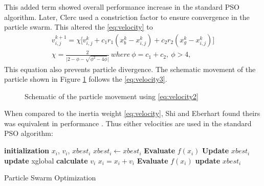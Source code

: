 This added term showed overall performance increase in the standard PSO algorithm. Later, Clerc \cite{Clerc1999} used a constriction factor to ensure convergence in the particle swarm. This altered the \eqref{eq:velocity} to 
\begin{align}
    \label{eq:velocity3}
    v^{k+1}_{i,j} = \chi \big[ v^{k}_{i,j} + c_1r_1(x^{k}_b - x^{k}_{i,j}) + c_2r_2(x^{k}_g - x^{k}_{i,j}) \big] \\
    \chi = \frac{2}{\big| 2- \phi - \sqrt{\phi^2 - 4\phi}\big|}\ where\ \phi = c_1 + c_2,\ \phi>4, \nonumber
\end{align}
This equation also prevents particle divergence. The schematic movement of the particle shown in Figure \ref{fig:particle movement} follows the \eqref{eq:velocity3}.

\begin{figure}[!h]
    \centering
    
    \caption{Schematic of the particle movement using \eqref{eq:velocity2}}
    \label{fig:particle movement}
\end{figure}

When compared to the inertia weight \eqref{eq:velocity}, Shi and Eberhart found theirs was equivalent in performance \cite{Shi}. 
Thus either velocities are used in the standard PSO algorithm: 
\begin{algorithm}[H]
  \begin{algorithmic}[1]

        \State \textbf{initialization} $x_i$, $v_i$, $xbest_i$ 
        $xbest_i \gets xbest_i$
        \State \textbf{Evaluate} $f(x_i)$  
        \State \textbf{Update} $xbest_i$ 
    \EndFor
            \State \textbf{update} xglobal 
            \State \textbf{calculate} $v_i$ 
            \State $x_i = x_i + v_i$
            \State \textbf{Evaluate} $f(x_i)$
            \State \textbf{update} $xbest_i$
        \EndFor
    \EndWhile
  \end{algorithmic}
\caption{Particle Swarm Optimization}
\label{algorithmPSO}
\end{algorithm}


